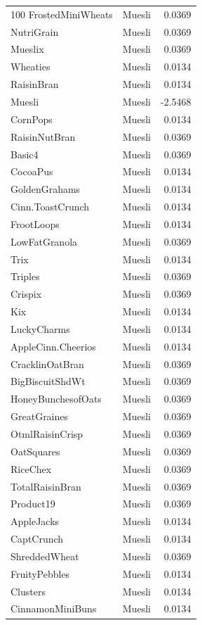 \begin{longtable}{llr}
100%
FrostedMiniWheats & Muesli & 0.0369 \\
NutriGrain & Muesli & 0.0369 \\
Mueslix & Muesli & 0.0369 \\
Wheaties & Muesli & 0.0134 \\
RaisinBran & Muesli & 0.0134 \\
Muesli & Muesli & -2.5468 \\
CornPops & Muesli & 0.0134 \\
RaisinNutBran & Muesli & 0.0369 \\
Basic4 & Muesli & 0.0369 \\
CocoaPus & Muesli & 0.0134 \\
GoldenGrahams & Muesli & 0.0134 \\
Cinn.ToastCrunch & Muesli & 0.0134 \\
FrootLoops & Muesli & 0.0134 \\
LowFatGranola & Muesli & 0.0369 \\
Trix & Muesli & 0.0134 \\
Triples & Muesli & 0.0369 \\
Crispix & Muesli & 0.0369 \\
Kix & Muesli & 0.0134 \\
LuckyCharms & Muesli & 0.0134 \\
AppleCinn.Cheerios & Muesli & 0.0134 \\
CracklinOatBran & Muesli & 0.0369 \\
BigBiscuitShdWt & Muesli & 0.0369 \\
HoneyBunchesofOats & Muesli & 0.0369 \\
GreatGraines & Muesli & 0.0369 \\
OtmlRaisinCrisp & Muesli & 0.0369 \\
OatSquares & Muesli & 0.0369 \\
RiceChex & Muesli & 0.0369 \\
TotalRaisinBran & Muesli & 0.0369 \\
Product19 & Muesli & 0.0369 \\
AppleJacks & Muesli & 0.0134 \\
CaptCrunch & Muesli & 0.0134 \\
ShreddedWheat & Muesli & 0.0369 \\
FruityPebbles & Muesli & 0.0134 \\
Clusters & Muesli & 0.0134 \\
CinnamonMiniBuns & Muesli & 0.0134 \\

\end{longtable}
